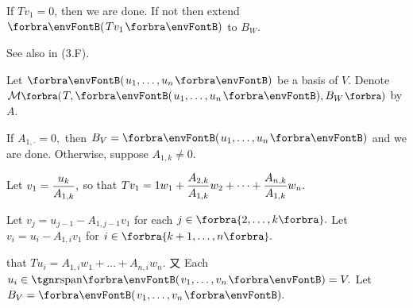 If $Tv_1=0$, then we are done. If not then extend $\Par{Tv_1}$ to $B_W.$\PfEnd
\SepLine\pagebreak

See also in (3.F).\par\quad
Let $\Par{u_1,\dots,u_n}$ be a basis of $V$. Denote $\Mt[\BigPar]{T,\Par{u_1,\dots,u_n},B_W}$ by $A.$\par\quad
If $A_{1,\cdot}=0,$ then $B_V=\Par{u_1,\dots,u_n}$ and we are done. Otherwise, suppose $A_{1,k}\neq 0.$\vspace{2pt}\par\quad
Let $v_1={\displaystyle{\frac{u_k}{A_{1,k}}}},$ so that  $Tv_1=1w_1+{\displaystyle{\frac{A_{2,k}}{A_{1,k}}}}w_2+\dots+{\displaystyle{\frac{A_{n,k}}{A_{1,k}}}}w_n.$\vspace{6pt}\par\quad
Let $v_j=u_{j-1}-A_{1,j-1}v_1$ for each $j\in\Bra{2,\dots,k}.$ \;Let $v_i=u_i-A_{1,i} v_1$ for $i\in\Bra{k+1,\dots,n}.$\vspace{2pt}\par\quad
\NOTICE that $Tu_i=A_{1,i}w_1+\dots+A_{n,i}w_n.$ 又 Each $u_i\in\Span{v_1,\dots,v_n}=V.$ Let $B_V=\Par{v_1,\dots,v_n}.$\PfEnd
\SepLine

